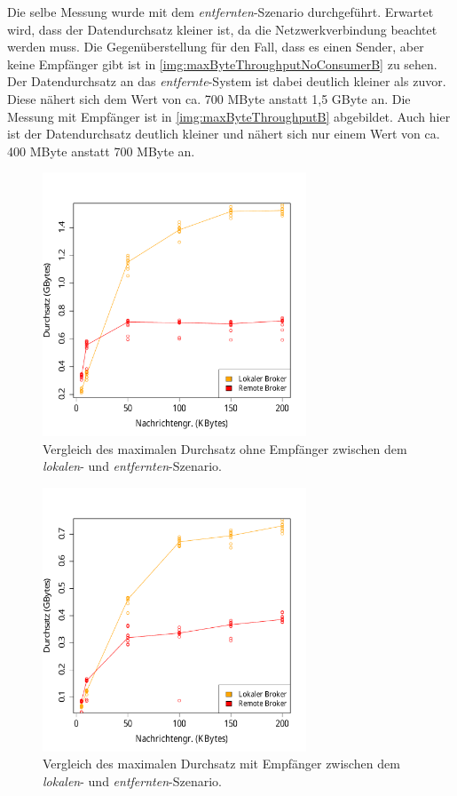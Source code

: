 Die selbe Messung wurde mit dem \textit{entfernten}-Szenario durchgeführt. Erwartet wird, dass der Datendurchsatz kleiner ist, da die Netzwerkverbindung beachtet werden muss. 
Die Gegenüberstellung für den Fall, dass es einen Sender, aber keine Empfänger gibt ist in \autoref{img:maxByteThroughputNoConsumerB} zu sehen. Der Datendurchsatz an das \textit{entfernte}-System ist dabei deutlich kleiner als zuvor. Diese nähert sich dem Wert von ca. 700 MByte anstatt 1,5 GByte an. Die Messung mit Empfänger ist in \autoref{img:maxByteThroughputB} abgebildet. Auch hier ist der Datendurchsatz deutlich kleiner und nähert sich nur einem Wert von ca. 400 MByte anstatt 700 MByte an.
\begin{figure}
\center
 \includegraphics[width=0.7\textwidth]{images/measurement/rate-limit-unlimited-no-consumer-AvsB.pdf}
  \caption{Vergleich des maximalen Durchsatz ohne Empfänger zwischen dem \textit{lokalen}- und  \textit{entfernten}-Szenario.}
  \label{img:maxByteThroughputNoConsumerB}
\end{figure}
\begin{figure}
\center
 \includegraphics[width=0.7\textwidth]{images/measurement/rate-limit-unlimited-AvsB.pdf}
  \caption{Vergleich des maximalen Durchsatz mit Empfänger zwischen dem \textit{lokalen}- und  \textit{entfernten}-Szenario.}
  \label{img:maxByteThroughputB}
\end{figure}
